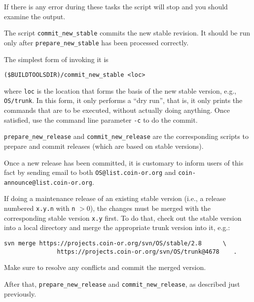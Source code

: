 If there is any error during these tasks the script will stop and you should
examine the output.
   
\medskip

The script {\tt commit\_new\_stable} commits the new stable revision. It should be run only after 
{\tt prepare\_new\_stable} has been processed correctly.  

The simplest form of invoking it is

\begin{verbatim}
($BUILDTOOLSDIR)/commit_new_stable <loc>
\end{verbatim}

\noindent
where {\tt loc} is the location that forms the basis of the new stable version, e.g., {\tt OS/trunk}. In this form, it only performs a ``dry run'', that is, it only prints the commands that are to be executed, without actually doing anything. Once satisfied, use the command line parameter {\tt -c} to do the commit.



{\tt prepare\_new\_release} and {\tt commit\_new\_release} are the corresponding scripts to prepare and commit releases (which are based on stable versions).

Once a new release has been committed, it is customary to inform users of this fact by sending email to both {\tt OS@list.coin-or.org} and {\tt coin-announce@list.coin-or.org}.

If doing a maintenance release of an existing stable version (i.e., a release numbered {\tt x.y.n} with {\tt n} $>0$), the changes must be merged with the corresponding stable version {\tt x.y} first.
To do that, check out the stable version into a local directory and merge the appropriate trunk version into it, e.g.:

\begin{verbatim}
svn merge https://projects.coin-or.org/svn/OS/stable/2.8      \
               https://projects.coin-or.org/svn/OS/trunk@4678    .
\end{verbatim} 

Make sure to resolve any conflicts and commit the merged version.

After that, {\tt prepare\_new\_release} and {\tt commit\_new\_release}, as described just previously.
 

